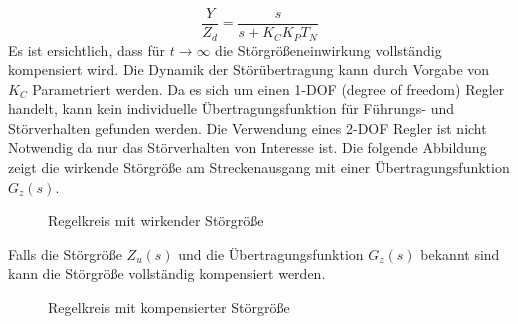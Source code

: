 \begin{equation}
\frac{Y}{Z_d} = \frac{s}{s+K_CK_PT_N}
\end{equation}
Es ist ersichtlich, dass für $t\rightarrow\infty$ die Störgrößeneinwirkung vollständig kompensiert wird. Die Dynamik der Störübertragung kann durch Vorgabe von $K_C$ Parametriert werden. Da es sich um einen 1-DOF (degree of freedom) Regler handelt, kann kein individuelle Übertragungsfunktion für Führungs- und Störverhalten gefunden werden. Die Verwendung eines 2-DOF Regler ist nicht Notwendig da nur das Störverhalten von Interesse ist. Die folgende Abbildung zeigt die wirkende Störgröße am Streckenausgang mit einer Übertragungsfunktion $G_z(s)$.
\begin{figure}[H]
\caption{Regelkreis mit wirkender Störgröße}
\label{Grundlagen:RegelkreisStörgröße}
\end{figure}
Falls die Störgröße $Z_u(s)$ und die Übertragungsfunktion $G_z(s)$ bekannt sind kann die Störgröße vollständig kompensiert werden. 
\begin{figure}[H]
\caption{Regelkreis mit kompensierter Störgröße}
\label{Grundlagen:RegelkreisStörgrößeKompensiert}
\end{figure}